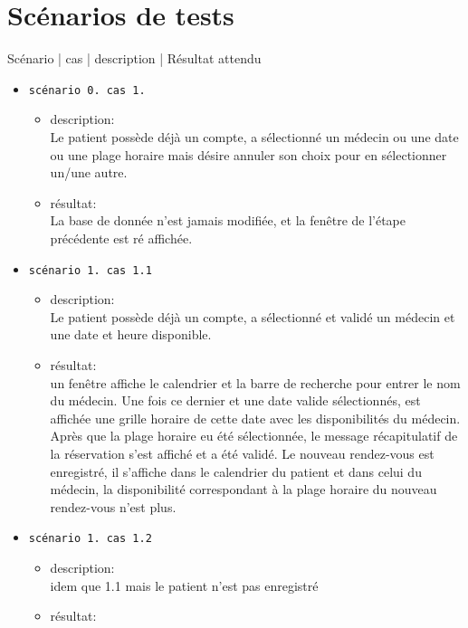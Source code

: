 	\section{Scénarios de tests}
	Scénario |   cas  |         description    |   Résultat attendu 

	\begin{itemize}
		\item[] \texttt{scénario 0. cas 1.} 
			\begin{itemize}
				\item description: \\
					Le patient possède déjà un compte, a sélectionné un médecin ou une date ou une
					plage horaire mais désire annuler son choix pour en sélectionner un/une autre.
				\item résultat:\\
					La base de donnée n’est jamais modifiée, et la fenêtre de l’étape précédente
					est ré affichée.\\
			\end{itemize}
		\item[] \texttt{scénario 1. cas 1.1}
			\begin{itemize}
				\item description:  \\
					Le patient possède déjà un compte, a sélectionné et validé
					un médecin et une date et heure disponible.
				\item résultat: \\
					un fenêtre affiche le calendrier et la barre de recherche
					pour entrer le nom du médecin. 
					Une fois ce dernier et une date valide sélectionnés, est
					affichée une grille horaire de cette date avec les
					disponibilités du médecin. Après que la plage horaire eu
					été sélectionnée, 
					le message récapitulatif de la réservation s’est affiché et
					a été validé. 
					Le nouveau rendez-vous est enregistré, il s’affiche dans le
					calendrier du patient et dans celui du médecin, la
					disponibilité correspondant à la plage horaire du nouveau
					rendez-vous n’est plus.\\
			\end{itemize}
		\item[] \texttt{scénario 1. cas 1.2}
			\begin{itemize}
				\item description:  \\
					idem que 1.1 mais le patient n’est pas enregistré
				\item résultat: \\

\end{itemize}
\end{itemize}
